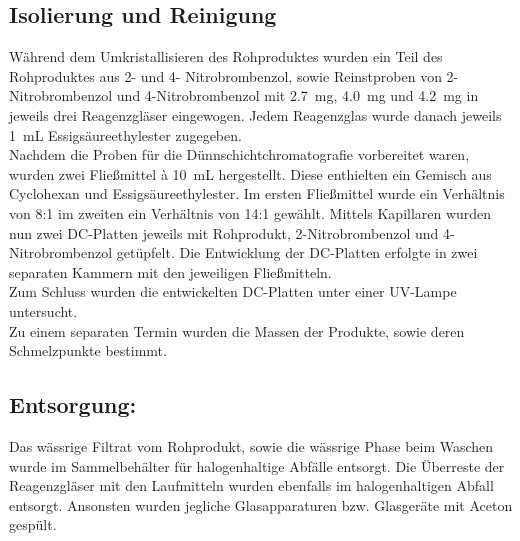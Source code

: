 \subsection*{Isolierung und Reinigung}
Während dem Umkristallisieren des Rohproduktes wurden ein Teil des Rohproduktes aus 2- und 4- Nitrobrombenzol, sowie Reinstproben von 2-Nitrobrombenzol und 4-Nitrobrombenzol mit \SI{2,7}{\milli \gram}, \SI{4,0}{\milli \gram} und \SI{4,2}{\milli \gram} in jeweils drei Reagenzgläser eingewogen. Jedem Reagenzglas wurde danach jeweils \SI{1}{\milli \liter} Essigsäureethylester zugegeben.\\
Nachdem die Proben für die Dünnschichtchromatografie vorbereitet waren, wurden zwei Fließmittel à \SI{10}{\milli \liter} hergestellt. Diese enthielten ein Gemisch aus Cyclohexan und Essigsäureethylester. Im ersten Fließmittel wurde ein Verhältnis von 8:1 im zweiten ein Verhältnis von 14:1 gewählt. Mittels Kapillaren wurden nun zwei DC-Platten jeweils mit Rohprodukt, 2-Nitrobrombenzol und 4-Nitrobrombenzol getüpfelt. Die Entwicklung der DC-Platten erfolgte in zwei separaten Kammern mit den jeweiligen Fließmitteln. \\
Zum Schluss wurden die entwickelten DC-Platten unter einer UV-Lampe untersucht.\\
Zu einem separaten Termin wurden die Massen der Produkte, sowie deren Schmelzpunkte bestimmt.

\subsection*{Entsorgung:}
Das wässrige Filtrat vom Rohprodukt, sowie die wässrige Phase beim Waschen wurde im Sammelbehälter für halogenhaltige Abfälle entsorgt. Die Überreste der Reagenzgläser mit den Laufmitteln wurden ebenfalls im halogenhaltigen Abfall entsorgt. Ansonsten wurden jegliche Glasapparaturen bzw. Glasgeräte mit Aceton gespült.

\newpage
